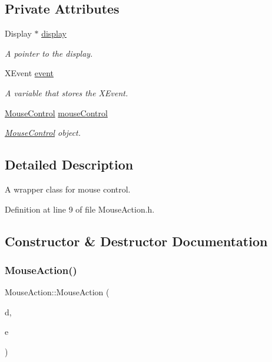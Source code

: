 \subsection*{Private Attributes}
\begin{DoxyCompactItemize}
\item 
Display $\ast$ \hyperlink{class_ubuntu_controller_1_1_mouse_action_abda7df4e11759c46bd0c419575353e8a}{display}
\begin{DoxyCompactList}\small\item\em A pointer to the display. \end{DoxyCompactList}\item 
X\+Event \hyperlink{class_ubuntu_controller_1_1_mouse_action_aac4074eeeab2989da4a645ed9c118c22}{event}
\begin{DoxyCompactList}\small\item\em A variable that stores the X\+Event. \end{DoxyCompactList}\item 
\hyperlink{class_ubuntu_controller_1_1_mouse_control}{Mouse\+Control} \hyperlink{class_ubuntu_controller_1_1_mouse_action_a8c5da1d5bd3de8f926fc132335cf9156}{mouse\+Control}
\begin{DoxyCompactList}\small\item\em \hyperlink{class_ubuntu_controller_1_1_mouse_control}{Mouse\+Control} object. \end{DoxyCompactList}\end{DoxyCompactItemize}


\subsection{Detailed Description}
A wrapper class for mouse control. 

Definition at line 9 of file Mouse\+Action.\+h.



\subsection{Constructor \& Destructor Documentation}
\mbox{\label{class_ubuntu_controller_1_1_mouse_action_a42e540b994144f3f8775baded5370b14}} 
\subsubsection{\texorpdfstring{Mouse\+Action()}{MouseAction()}}
{\footnotesize\ttfamily Mouse\+Action\+::\+Mouse\+Action (\begin{DoxyParamCaption}\item[{Display $\ast$}]{d,  }\item[{X\+Event}]{e }\end{DoxyParamCaption})}

